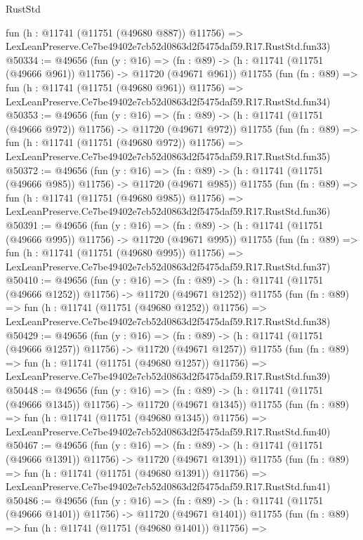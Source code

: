 \begin{lexlean}{RustStd}
\begin{coremodule}
    fun (h : @11741 (@11751 (@49680 @887)) @11756) =>
    LexLeanPreserve.Ce7be49402e7cb52d0863d2f5475daf59.R17.RustStd.fun33)
@50334 := @49656
    (fun (y : @16) =>
    (fn : @89) -> (h : @11741 (@11751 (@49666 @961)) @11756) -> @11720 (@49671 @961))
    @11755
    (fun (fn : @89) =>
    fun (h : @11741 (@11751 (@49680 @961)) @11756) =>
    LexLeanPreserve.Ce7be49402e7cb52d0863d2f5475daf59.R17.RustStd.fun34)
@50353 := @49656
    (fun (y : @16) =>
    (fn : @89) -> (h : @11741 (@11751 (@49666 @972)) @11756) -> @11720 (@49671 @972))
    @11755
    (fun (fn : @89) =>
    fun (h : @11741 (@11751 (@49680 @972)) @11756) =>
    LexLeanPreserve.Ce7be49402e7cb52d0863d2f5475daf59.R17.RustStd.fun35)
@50372 := @49656
    (fun (y : @16) =>
    (fn : @89) -> (h : @11741 (@11751 (@49666 @985)) @11756) -> @11720 (@49671 @985))
    @11755
    (fun (fn : @89) =>
    fun (h : @11741 (@11751 (@49680 @985)) @11756) =>
    LexLeanPreserve.Ce7be49402e7cb52d0863d2f5475daf59.R17.RustStd.fun36)
@50391 := @49656
    (fun (y : @16) =>
    (fn : @89) -> (h : @11741 (@11751 (@49666 @995)) @11756) -> @11720 (@49671 @995))
    @11755
    (fun (fn : @89) =>
    fun (h : @11741 (@11751 (@49680 @995)) @11756) =>
    LexLeanPreserve.Ce7be49402e7cb52d0863d2f5475daf59.R17.RustStd.fun37)
@50410 := @49656
    (fun (y : @16) =>
    (fn : @89) -> (h : @11741 (@11751 (@49666 @1252)) @11756) -> @11720 (@49671 @1252))
    @11755
    (fun (fn : @89) =>
    fun (h : @11741 (@11751 (@49680 @1252)) @11756) =>
    LexLeanPreserve.Ce7be49402e7cb52d0863d2f5475daf59.R17.RustStd.fun38)
@50429 := @49656
    (fun (y : @16) =>
    (fn : @89) -> (h : @11741 (@11751 (@49666 @1257)) @11756) -> @11720 (@49671 @1257))
    @11755
    (fun (fn : @89) =>
    fun (h : @11741 (@11751 (@49680 @1257)) @11756) =>
    LexLeanPreserve.Ce7be49402e7cb52d0863d2f5475daf59.R17.RustStd.fun39)
@50448 := @49656
    (fun (y : @16) =>
    (fn : @89) -> (h : @11741 (@11751 (@49666 @1345)) @11756) -> @11720 (@49671 @1345))
    @11755
    (fun (fn : @89) =>
    fun (h : @11741 (@11751 (@49680 @1345)) @11756) =>
    LexLeanPreserve.Ce7be49402e7cb52d0863d2f5475daf59.R17.RustStd.fun40)
@50467 := @49656
    (fun (y : @16) =>
    (fn : @89) -> (h : @11741 (@11751 (@49666 @1391)) @11756) -> @11720 (@49671 @1391))
    @11755
    (fun (fn : @89) =>
    fun (h : @11741 (@11751 (@49680 @1391)) @11756) =>
    LexLeanPreserve.Ce7be49402e7cb52d0863d2f5475daf59.R17.RustStd.fun41)
@50486 := @49656
    (fun (y : @16) =>
    (fn : @89) -> (h : @11741 (@11751 (@49666 @1401)) @11756) -> @11720 (@49671 @1401))
    @11755
    (fun (fn : @89) =>
    fun (h : @11741 (@11751 (@49680 @1401)) @11756) =>

\end{coremodule}
\end{lexlean}
